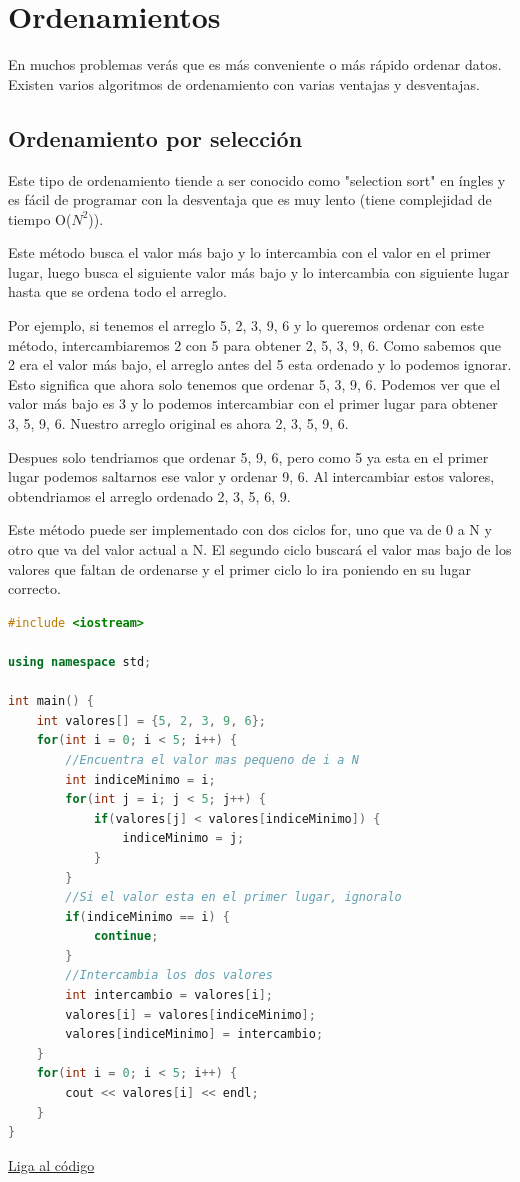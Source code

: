 \documentclass{article}
\begin{document}
\section{Ordenamientos}

En muchos problemas verás que es más conveniente o más rápido ordenar datos. Existen varios algoritmos de ordenamiento con varias ventajas y desventajas.

\subsection{Ordenamiento por selección}

Este tipo de ordenamiento tiende a ser conocido como "selection sort" en íngles y es fácil de programar con la desventaja que es muy lento (tiene complejidad de tiempo O($N^2$)).

Este método busca el valor más bajo y lo intercambia con el valor en el primer lugar, luego busca el siguiente valor más bajo y lo intercambia con siguiente lugar hasta que se ordena todo el arreglo.

Por ejemplo, si tenemos el arreglo {5, 2, 3, 9, 6} y lo queremos ordenar con este método, intercambiaremos 2 con 5 para obtener {2, 5, 3, 9, 6}. Como sabemos que 2 era el valor más bajo, el arreglo antes del 5 esta ordenado y lo podemos ignorar. Esto significa que ahora solo tenemos que ordenar {5, 3, 9, 6}. Podemos ver que el valor más bajo es 3 y lo podemos intercambiar con el primer lugar para obtener {3, 5, 9, 6}. Nuestro arreglo original es ahora {2, 3, 5, 9, 6}.

Despues solo tendriamos que ordenar {5, 9, 6}, pero como 5 ya esta en el primer lugar podemos saltarnos ese valor y ordenar {9, 6}. Al intercambiar estos valores, obtendriamos el arreglo ordenado {2, 3, 5, 6, 9}.

Este método puede ser implementado con dos ciclos for, uno que va de 0 a N y otro que va del valor actual a N. El segundo ciclo buscará el valor mas bajo de los valores que faltan de ordenarse y el primer ciclo lo ira poniendo en su lugar correcto.

\begin{lstlisting}[language=C++, caption=Ordenamiento por selección]
#include <iostream>

using namespace std;

int main() {
    int valores[] = {5, 2, 3, 9, 6};
    for(int i = 0; i < 5; i++) {
        //Encuentra el valor mas pequeno de i a N
        int indiceMinimo = i;
        for(int j = i; j < 5; j++) {
            if(valores[j] < valores[indiceMinimo]) {
                indiceMinimo = j;
            }
        }
        //Si el valor esta en el primer lugar, ignoralo
        if(indiceMinimo == i) {
            continue;
        }
        //Intercambia los dos valores
        int intercambio = valores[i];
        valores[i] = valores[indiceMinimo];
        valores[indiceMinimo] = intercambio;
    }
    for(int i = 0; i < 5; i++) {
        cout << valores[i] << endl;
    }
}
\end{lstlisting}
\href{https://repl.it/@Jamesscn/Ordenamiento-de-seleccion}{Liga al código} \\
\end{document}
